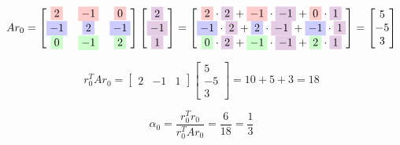 \documentclass[12pt,a4paper]{article}
\begin{document}
\[
Ar_0 = 
\begin{bmatrix}
\colorbox{red!20}{$2$} & \colorbox{red!20}{$-1$} & \colorbox{red!20}{$0$} \\
\colorbox{blue!20}{$-1$} & \colorbox{blue!20}{$2$} & \colorbox{blue!20}{$-1$} \\
\colorbox{green!20}{$0$} & \colorbox{green!20}{$-1$} & \colorbox{green!20}{$2$}
\end{bmatrix}
\begin{bmatrix}
\colorbox{violet!20}{$2$} \\
\colorbox{violet!20}{$-1$} \\
\colorbox{violet!20}{$1$}
\end{bmatrix}
=
\begin{bmatrix}
\colorbox{red!20}{$2$} \cdot \colorbox{violet!20}{$2$} + \colorbox{red!20}{$-1$} \cdot \colorbox{violet!20}{$-1$} + \colorbox{red!20}{$0$} \cdot \colorbox{violet!20}{$1$} \\
\colorbox{blue!20}{$-1$} \cdot \colorbox{violet!20}{$2$} + \colorbox{blue!20}{$2$} \cdot \colorbox{violet!20}{$-1$} + \colorbox{blue!20}{$-1$} \cdot \colorbox{violet!20}{$1$} \\
\colorbox{green!20}{$0$} \cdot \colorbox{violet!20}{$2$} + \colorbox{green!20}{$-1$} \cdot \colorbox{violet!20}{$-1$} + \colorbox{green!20}{$2$} \cdot \colorbox{violet!20}{$1$}
\end{bmatrix}
=
\begin{bmatrix}
5 \\ -5 \\ 3
\end{bmatrix}
\]

\[
r_0^T A r_0 = \begin{bmatrix} 2 & -1 & 1 \end{bmatrix} \begin{bmatrix} 5 \\ -5 \\ 3 \end{bmatrix} = 10 + 5 + 3 = 18
\]

\[
\alpha_0 = \frac{r_0^T r_0}{r_0^T A r_0} = \frac{6}{18} = \frac{1}{3}
\]
\end{document}
